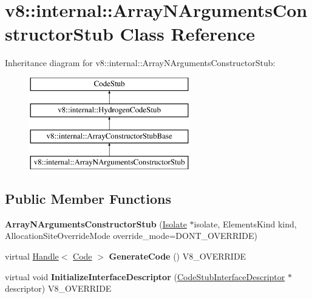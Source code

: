 \hypertarget{classv8_1_1internal_1_1_array_n_arguments_constructor_stub}{}\section{v8\+:\+:internal\+:\+:Array\+N\+Arguments\+Constructor\+Stub Class Reference}
\label{classv8_1_1internal_1_1_array_n_arguments_constructor_stub}
Inheritance diagram for v8\+:\+:internal\+:\+:Array\+N\+Arguments\+Constructor\+Stub\+:\begin{figure}[H]
\begin{center}
\leavevmode
\includegraphics[height=4.000000cm]{classv8_1_1internal_1_1_array_n_arguments_constructor_stub}
\end{center}
\end{figure}
\subsection*{Public Member Functions}
\begin{DoxyCompactItemize}
\item 
\hypertarget{classv8_1_1internal_1_1_array_n_arguments_constructor_stub_a9ec2931b8761a2b39a5c9b569d404a47}{}{\bfseries Array\+N\+Arguments\+Constructor\+Stub} (\hyperlink{classv8_1_1internal_1_1_isolate}{Isolate} $\ast$isolate, Elements\+Kind kind, Allocation\+Site\+Override\+Mode override\+\_\+mode=D\+O\+N\+T\+\_\+\+O\+V\+E\+R\+R\+I\+D\+E)\label{classv8_1_1internal_1_1_array_n_arguments_constructor_stub_a9ec2931b8761a2b39a5c9b569d404a47}

\item 
\hypertarget{classv8_1_1internal_1_1_array_n_arguments_constructor_stub_afedf940551e906ecc410be1bf2a3f4ad}{}virtual \hyperlink{classv8_1_1internal_1_1_handle}{Handle}$<$ \hyperlink{classv8_1_1internal_1_1_code}{Code} $>$ {\bfseries Generate\+Code} () V8\+\_\+\+O\+V\+E\+R\+R\+I\+D\+E\label{classv8_1_1internal_1_1_array_n_arguments_constructor_stub_afedf940551e906ecc410be1bf2a3f4ad}

\item 
\hypertarget{classv8_1_1internal_1_1_array_n_arguments_constructor_stub_a2e4a946b9c0315bb62fd6940d4f5ad7f}{}virtual void {\bfseries Initialize\+Interface\+Descriptor} (\hyperlink{classv8_1_1internal_1_1_code_stub_interface_descriptor}{Code\+Stub\+Interface\+Descriptor} $\ast$descriptor) V8\+\_\+\+O\+V\+E\+R\+R\+I\+D\+E\label{classv8_1_1internal_1_1_array_n_arguments_constructor_stub_a2e4a946b9c0315bb62fd6940d4f5ad7f}

\end{DoxyCompactItemize}
